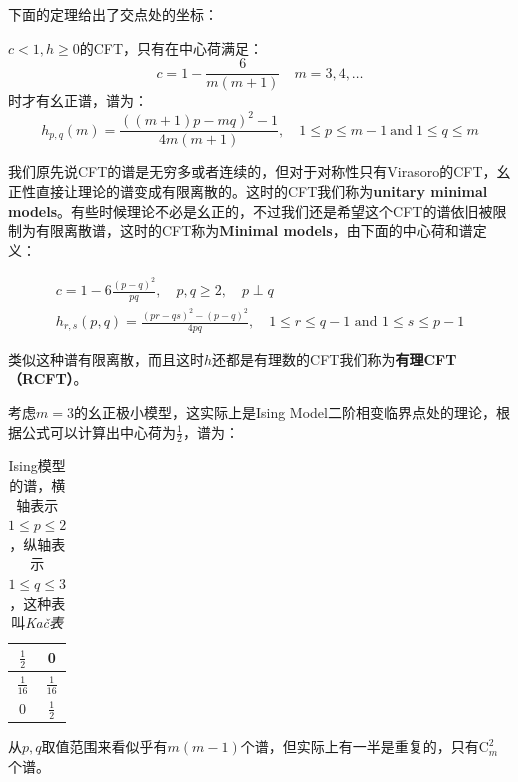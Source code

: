 下面的定理给出了交点处的坐标：
\begin{theorem}
	$c<1,h\geq 0$的CFT，只有在中心荷满足：
	\begin{equation}
	\boxed{
			c=1-\frac6{m(m+1)}\quad m=3,4,\ldots
	}
	\end{equation}
	时才有幺正谱，谱为：
	\begin{equation}
		\boxed{
			h_{p,q}(m)=\frac{\left(\left(m+1\right)p-mq\right)^2-1}{4m\left(m+1\right)},\quad 1\leq p\leq m-1\mathrm{~and~}1\leq q\leq m
		}
	\end{equation}
\end{theorem}
我们原先说CFT的谱是无穷多或者连续的，但对于对称性只有Virasoro的CFT，幺正性直接让理论的谱变成有限离散的。这时的CFT我们称为\textbf{unitary minimal models}。有些时候理论不必是幺正的，不过我们还是希望这个CFT的谱依旧被限制为有限离散谱，这时的CFT称为\textbf{Minimal models}，由下面的中心荷和谱定义：
\begin{theorem}
	\begin{equation}
		\boxed{
			\begin{gathered}
				c=1-6\frac{(p-q)^2}{pq},\quad p,q\geq2,\quad p\perp q\\
			h_{r,s}(p,q)=\frac{(pr-qs)^2-(p-q)^2}{4pq},\quad 1\leq r\leq q-1\text{ and }1\leq s\leq p-1
			\end{gathered}
		}
	\end{equation}
\end{theorem}
类似这种谱有限离散，而且这时$h$还都是有理数的CFT我们称为\textbf{有理CFT（RCFT）}。
\begin{example}
	考虑$m=3$的幺正极小模型，这实际上是Ising Model二阶相变临界点处的理论，根据公式可以计算出中心荷为$\frac{1}{2}$，谱为：
	\begin{table}[H]
		\centering
		\renewcommand{\arraystretch}{1.5}
			\begin{tabular}{|c|c|}
				\hline
				$\frac{1}{2}$  & 0              \\ \hline
				$\frac{1}{16}$ & $\frac{1}{16}$ \\ \hline
				0              & $\frac{1}{2}$  \\ \hline
			\end{tabular}
		\caption{Ising模型的谱，横轴表示$1\leq p\leq 2$，纵轴表示$1\leq q\leq 3$，这种表叫\textit{Ka\v{c}表}}
	\end{table}
	从$p,q$取值范围来看似乎有$m(m-1)$个谱，但实际上有一半是重复的，只有$\mathrm{C}^2_m$个谱。
\end{example}

